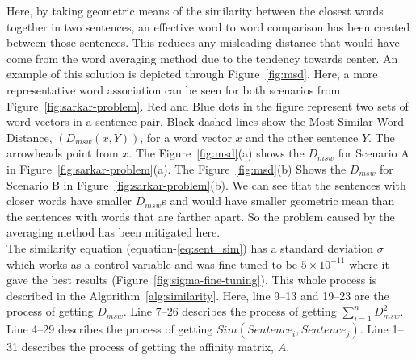 Here, by taking geometric means of the similarity between the closest words together in two sentences,
an effective word to word comparison has been created between those sentences.
This reduces any misleading distance that would have come from the word averaging method due to
the tendency towards center.
An example of this solution is depicted through Figure~\ref{fig:msd}.
Here, a more representative word association can be seen for both scenarios from Figure~\ref{fig:sarkar-problem}.
Red and Blue dots in the figure represent two sets of word vectors in a sentence pair.
Black-dashed lines show the Most Similar Word Distance, $(D_{msw}(x,Y))$,
for a word vector $x$ and the other sentence $Y$.
The arrowheads point from $x$.
The Figure~\ref{fig:msd}(a) shows the $D_{msw}$ for Scenario A in Figure~\ref{fig:sarkar-problem}(a).
The Figure~\ref{fig:msd}(b) Shows the $D_{msw}$ for Scenario B in Figure~\ref{fig:sarkar-problem}(b).
We can see that the sentences with closer words have smaller $D_{msw}$s and would have smaller geometric mean
than the sentences with words that are farther apart.
So the problem caused by the averaging method has been mitigated here.\\

The similarity equation (equation-\ref{eq:sent_sim}) has a standard deviation $\sigma$ which works
as a control variable and was fine-tuned to be $5\times10^{-11}$ where
it gave the best results (Figure~\ref{fig:sigma-fine-tuning}).
This whole process is described in the Algorithm~\ref{alg:similarity}.
Here, line 9--13 and 19--23 are the process of getting $D_{msw}$.
Line 7--26 describes the process of getting $\sum^n_{i=1}D_{msw}^2$.
Line 4--29 describes the process of getting $Sim(Sentence_i,Sentence_j)$.
Line 1--31 describes the process of getting the affinity matrix, $A$.

